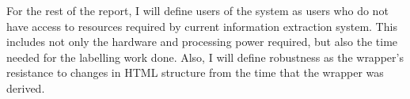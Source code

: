 For the rest of the report, I will define users of the system as users who do not have access 
to resources required by current information extraction system. This includes not only the 
hardware and processing power required, but also the time needed for the labelling work done.
Also, I will define robustness as the wrapper's resistance to changes in HTML structure from
the time that the wrapper was derived.






